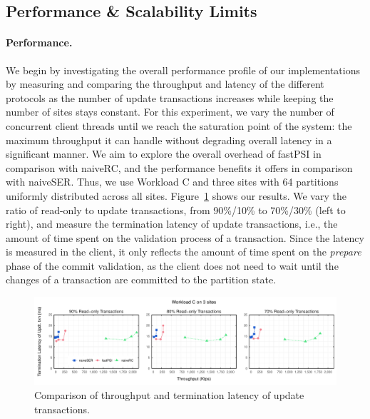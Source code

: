 \subsection{Performance \& Scalability Limits}

\paragraph{Performance.} We begin by investigating the overall performance profile of our implementations by measuring and comparing the throughput and latency of the different protocols as the number of update transactions increases while keeping the number of sites stays constant. For this experiment, we vary the number of concurrent client threads until we reach the saturation point of the system: the maximum throughput it can handle without degrading overall latency in a significant manner. We aim to explore the overall overhead of fastPSI in comparison with naiveRC, and the performance benefits it offers in comparison with naiveSER. Thus, we use Workload C and three sites with 64 partitions uniformly distributed across all sites. Figure~\ref{fig:general_bench} shows our results. We vary the ratio of read-only to update transactions, from 90\%/10\% to 70\%/30\% (left to right), and measure the termination latency of update transactions, i.e., the amount of time spent on the validation process of a transaction. Since the latency is measured in the client, it only reflects the amount of time spent on the \emph{prepare} phase of the commit validation, as the client does not need to wait until the changes of a transaction are committed to the partition state.

\begin{figure}[t]
\vspace{-0.5cm}
\includegraphics[width=\textwidth]{figures/general_bench.pdf}
\vspace{-1cm}
\caption{Comparison of throughput and termination latency of update transactions. }
\label{fig:general_bench}
\end{figure}

